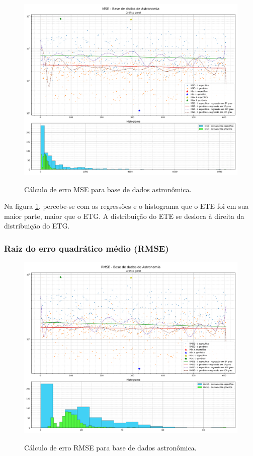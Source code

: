 \begin{figure}[H]
    \centering
    \caption{Cálculo de erro MSE para base de dados astronômica.}
    \includegraphics[width=16cm]{fig/resultados/astronomy/png/mse_astronomy_compound.png}
    \label{fig:results:fig5}
\end{figure}

Na figura \ref{fig:results:fig5}, percebe-se com as regressões e o histograma que o ETE foi em sua maior parte, maior que o ETG. A distribuição do ETE se desloca à direita da distribuição do ETG.

\subsubsection{Raiz do erro quadrático médio (RMSE)}
\label{sec:result:astronomy:rmse}

\begin{figure}[H]
    \centering
    \caption{Cálculo de erro RMSE para base de dados astronômica.}
    \includegraphics[width=16cm]{fig/resultados/astronomy/png/rmse_astronomy_compound.png}
    \label{fig:results:fig6}
\end{figure}

